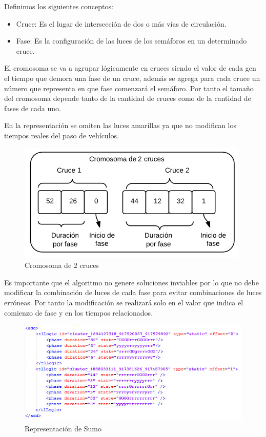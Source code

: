 Definimos los siguientes conceptos:
\begin{itemize}
	\item Cruce: Es el lugar de intersección de dos o más vías de circulación.
	\item Fase: Es la configuración de las luces de los semáforos en un determinado cruce.
\end{itemize}


El  cromosoma  se  va  a  agrupar  lógicamente  en  cruces siendo el valor de cada gen el tiempo que demora una
fase de un cruce, además se agrega para cada cruce un número que representa en que fase comenzará el semáforo. 
Por tanto el tamaño del cromosoma depende tanto de la cantidad de cruces como de la cantidad de fases de cada uno.

En la representación se omiten las luces amarillas ya que no modifican los tiempos reales del paso de vehículos.
 
 \begin{figure}[h]
 	\centering
 	\includegraphics[width=0.7\linewidth]{Figures/cromosoma1}
 	\caption{Cromosoma de 2 cruces}
 	\label{fig:cromosoma1}
 \end{figure}
 
Es  importante que el algoritmo no genere soluciones inviables por lo que no debe modificar la combinación de luces de cada fase para evitar combinaciones de luces erróneas. Por tanto la modificación se realizará solo en el valor que indica el comienzo de fase y en los tiempos relacionados.

\begin{figure}[H]
	\centering
	\includegraphics[width=\linewidth]{Figures/rep_sumo2}
	\caption{Representación de Sumo}
	\label{fig:rep_sumo}
\end{figure}

